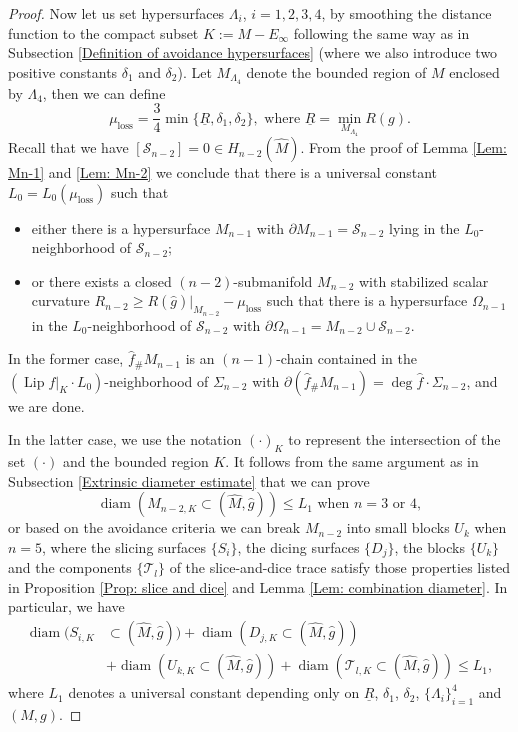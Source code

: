 \documentclass[11pt,letterpaper]{amsart}
\numberwithin{equation}{section}
\theoremstyle{definition}
\DeclareMathOperator{\Lip}{Lip}
\DeclareMathOperator{\diam}{diam}
\begin{document}
\begin{proof}
Now let us set hypersurfaces $\Lambda_i$, $i=1,2,3,4$, by smoothing the distance function to the compact subset $K:=M-E_{\infty}$ following the same way as in Subsection \ref{Definition of avoidance hypersurfaces} (where we also introduce two positive constants $\delta_1$ and $\delta_2$). Let $M_{\Lambda_4}$ denote the bounded region of $M$ enclosed by $\Lambda_4$, then we can define
$$
\mu_{\mathrm{loss}}=\frac{3}{4}\min\{\underline R,\delta_1,\delta_2\}, \mbox{ where }\underline R=\min_{M_{\Lambda_4}}R(g).
$$
Recall that we have $[\mathcal S_{n-2}]=0\in H_{n-2}(\widehat M)$. From the proof of Lemma \ref{Lem: Mn-1} and \ref{Lem: Mn-2} we conclude that there is a universal constant $L_0=L_0(\mu_{\mathrm{loss}})$ such that
\begin{itemize}\setlength{\itemsep}{1mm}
\item either there is a hypersurface $M_{n-1}$ with $\partial M_{n-1}=\mathcal S_{n-2}$ lying in the $L_0$-neighborhood of $\mathcal S_{n-2}$;
\item or there exists a closed $(n-2)$-submanifold $M_{n-2}$ with stabilized scalar curvature $R_{n-2}\geq R(\hat g)|_{M_{n-2}}-\mu_{\mathrm{loss}}$ such that there is a hypersurface $\Omega_{n-1}$ in the $L_0$-neighborhood of $\mathcal S_{n-2}$ with $\partial\Omega_{n-1}=M_{n-2}\cup\mathcal S_{n-2}$.
\end{itemize}

In the former case, $\hat f_\#M_{n-1}$ is an $(n-1)$-chain contained in the $(\Lip f|_{K}\cdot L_0)$-neighborhood of $\Sigma_{n-2}$ with $\partial(\hat f_\#M_{n-1})=\deg \hat f\cdot \Sigma_{n-2}$, and we are done.

In the latter case, we use the notation $(\cdot)_K$ to represent the intersection of the set $(\cdot)$ and the bounded region $K$. It follows from the same argument as in Subsection \ref{Extrinsic diameter estimate} that we can prove
$$
\diam(M_{n-2,K}\subset (\widehat M,\hat g))\leq L_1\text{ when $n=3$ or $4$},
$$
or based on the avoidance criteria we can break $M_{n-2}$ into small blocks $U_k$ when $n=5$, where the slicing surfaces $\{S_i\}$, the dicing surfaces $\{D_j\}$, the blocks $\{U_k\}$ and the components $\{\mathcal T_l\}$ of the slice-and-dice trace satisfy those properties listed in Proposition \ref{Prop: slice and dice} and Lemma \ref{Lem: combination diameter}. In particular, we have
\begin{equation}\label{Eq: extrinsic diameter again}
\begin{split}
\diam(S_{i,K}&\subset (\widehat M,\hat g))+\diam(D_{j,K}\subset (\widehat M,\hat g))\\
&+\diam(U_{k,K}\subset (\widehat M,\hat g))+
\diam(\mathcal T_{l,K}\subset (\widehat M,\hat g))\leq L_1,
\end{split}
\end{equation}
where $L_1$ denotes a universal constant depending only on $\underline R$, $\delta_1$, $\delta_2$, $\{\Lambda_i\}_{i=1}^4$ and $(M,g)$.


\end{proof}
\end{document}

